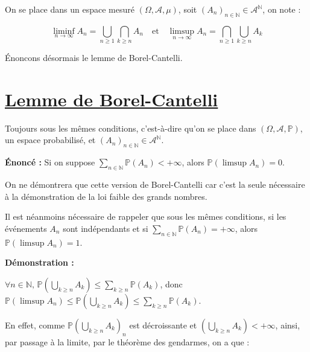 \documentclass{article}
\begin{document}
\vspace{0.3cm}
\noindent
On se place dans un espace mesuré $(\Omega, \mathcal{A}, \mu)$, soit $(A_n)_{n \in \mathbb{N}} \in \mathcal{A}^\mathbb{N}$, on note :

\[
\liminf_{n \to \infty} A_n = \bigcup_{n \geq 1} \bigcap_{k \geq n} A_n
\quad \text{et} \quad
\limsup_{n \to \infty} A_n = \bigcap_{n \geq 1} \bigcup_{k \geq n} A_k
\]

\vspace{0.3cm}
\noindent
Énoncons désormais le lemme de Borel-Cantelli.

\section*{\underline{Lemme de Borel-Cantelli }}

\vspace{0.3cm}
\noindent
Toujours sous les mêmes conditions, c'est-à-dire qu'on se place dans $(\Omega, \mathcal{A}, \mathbb{P})$, un espace probabilisé, et $(A_n)_{n \in \mathbb{N}} \in \mathcal{A}^\mathbb{N}$.

\vspace{0.5cm}
\noindent
\textbf{Énoncé :}
Si on suppose $\sum_{n \in \mathbb{N}} \mathbb{P}(A_n) < +\infty$, alors $\mathbb{P}(\limsup A_n) = 0$. 

\vspace{0.3cm}
\noindent
On ne démontrera que cette version de Borel-Cantelli car c'est la seule nécessaire à la démonstration de la loi faible des grands nombres.

\vspace{0.3cm}
\noindent
Il est néanmoins nécessaire de rappeler que sous les mêmes conditions, si les événements $A_n$ sont indépendants et si $\sum_{n \in \mathbb{N}} \mathbb{P}(A_n) = +\infty$, alors $\mathbb{P}(\limsup A_n) = 1$.


\vspace{0.5cm}
\noindent
\textbf{Démonstration :}

\vspace{0.1cm}
\noindent
$\forall n \in \mathbb{N}, \, \mathbb{P}\left(\bigcup_{k \geq n} A_k\right) \leq \sum_{k \geq n} \mathbb{P}(A_k)$, donc $\mathbb{P}(\limsup A_n) \leq \mathbb{P}\left(\bigcup_{k \geq n} A_k\right) \leq \sum_{k \geq n} \mathbb{P}(A_k) $.

\vspace{0.1cm}
\noindent
En effet, comme $\mathbb{P}\left(\bigcup_{k \geq n} A_k\right)_n$ est décroissante et $\left(\bigcup_{k \geq n} A_k\right) < +\infty$,  
ainsi, par passage à la limite, par le théorème des gendarmes, on a que :
\end{document}
